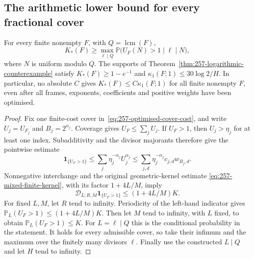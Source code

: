 \subsection{The arithmetic lower bound for every fractional cover}
\begin{cor}\label{cor:257-logarithmic-separation}
For every finite nonempty $F$, with $Q=\operatorname{lcm}(F)$,
\begin{equation}
 K_*(F)\ge\max_{\ell\mid Q}
   \mathbb P\bigl(U_F(N)>1\mid\ell\mid N\bigr),
 \label{eq:257-arithmetic-cover-lower}
\end{equation}
where $N$ is uniform modulo $Q$.
The supports of Theorem~\ref{thm:257-logarithmic-counterexample} satisfy
$K_*(F)\ge1-e^{-1}$ and $\kappa_1(F;1)\le30\log2/H$.
In particular, no absolute $C$ gives $K_*(F)\le C\kappa_1(F;1)$
for all finite nonempty $F$, even after all frames, exponents, coefficients
and positive weights have been optimised.
\end{cor}
\begin{proof}
Fix one finite-cost cover in~\eqref{eq:257-optimised-cover-cost}, and write
$U_j=U_{F_j}$ and $B_j=2^{\alpha_j}$.
Coverage gives $U_F\le\sum_jU_j$.  If $U_F>1$, then $U_j>\eta_j$
for at least one index.  Subadditivity and the divisor majorants therefore
give the pointwise estimate
\[
 \mathbf1_{\{U_F>1\}}
 \le\sum_j\eta_j^{-\alpha_j}U_j^{\alpha_j}
 \le\sum_{j,d}\eta_j^{-\alpha_j}c_{j,d}w_{B_j,d}.
\]
Nonnegative interchange and the original geometric-kernel estimate
\eqref{eq:257-mixed-finite-kernel}, with its factor $1+4L/M$, imply
\[
 \mathscr D_{L;R,M}\mathbf1_{\{U_F>1\}}\le(1+4L/M)K.
\]
For fixed $L,M$, let $R$ tend to infinity.  Periodicity of the left-hand
indicator gives $\mathbb P_L(U_F>1)\le(1+4L/M)K$.
Then let $M$ tend to infinity, with $L$ fixed, to obtain
$\mathbb P_L(U_F>1)\le K$.
For $L=\ell\mid Q$ this is the conditional probability in the statement.
It holds for every admissible cover, so take their infimum and the maximum
over the finitely many divisors $\ell$.  Finally use the constructed
$L\mid Q$ and let $H$ tend to infinity.
\end{proof}

